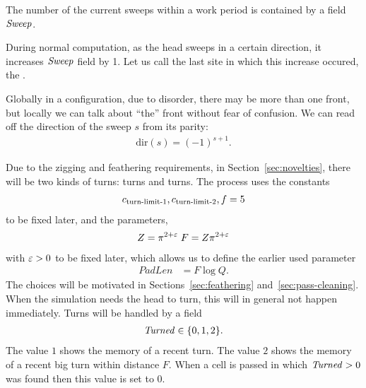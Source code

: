 \documentclass[11pt]{memoir}
\theoremstyle{definition} %
\newcommand{\fld}[1]{\ensuremath{\textit{#1\/}}}
\renewcommand{\f}{f} %
\newcommand{\F}{F}
\newcommand{\passno}{\pi}
\newcommand{\Q}{Q}
\newcommand{\Z}{Z}
\newcommand{\Turned}{\fld{Turned}}
\newcommand{\Sweep}{\fld{Sweep}}
\newcommand{\dir}{\mathrm{dir}}
\newcommand{\PadLen}{\mathit{PadLen}}
\newcommand{\cns}[1]{c_{\textrm{\upshape #1}}}
\begin{document}
The number of the current sweeps within a work period is contained by a field \( \Sweep \).

\begin{definition}[Front]\label{def:front}
  During normal computation, as the head sweeps in a certain direction, it increases \( \Sweep \) field by 1.
Let us call the last site in which this increase occured, the .
\end{definition}
Globally in a configuration, due to disorder, there may be more than one front, but locally
we can talk about ``the'' front without fear of confusion.
We can read off the direction of the sweep \( s \) from its parity:
 \begin{align}\label{eq:sweep-dir}
       \dir(s)=(-1)^{s + 1}.
 \end{align}

 Due to the zigging and feathering requirements, in Section~\ref{sec:novelties},
 there will be two kinds of turns:  turns and  turns.
 The process uses the constants
\begin{align}\label{eq:turn-limit}
   \cns{turn-limit-1}, \cns{turn-limit-2},   \f = 5
\end{align}
to be fixed later, and the parameters,
\begin{align}\label{eq:FDef}
\Z = \passno^{2+\eps}\; \F = \Z\passno^{2+\eps}
\end{align}
with \( \varepsilon>0 \) to be fixed later, which  allows us to define the earlier used parameter
\begin{align}\label{eq:PadLenDef}
  \PadLen &= \F\log\Q.   
 \end{align}
The choices will be motivated in Sections~\ref{sec:feathering} and~\ref{sec:pass-cleaning}.
When the simulation needs the head to turn, this will in general not happen immediately.
Turns will be handled by a field
\begin{align*}
   \Turned\in\{ 0,1,2 \}.
\end{align*}
The value \( 1 \) shows the memory of a recent turn.
The value \( 2 \) shows the memory of a recent big turn within distance \( \F \).
When a cell is passed in which \( \Turned>0 \) was found then this value is set to \( 0 \).
\end{document}

